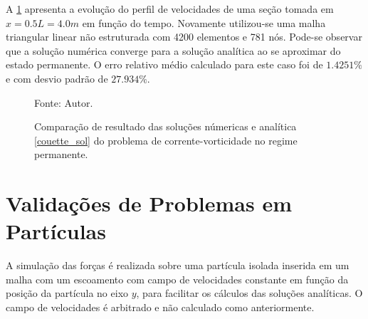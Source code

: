 A \ref{couette_comp} apresenta a evolução do perfil de velocidades de uma seção tomada em $x=0.5L=4.0m$ em função do tempo.
Novamente utilizou-se uma malha triangular linear não estruturada com 4200 elementos e 781 nós.
Pode-se observar que a solução numérica converge para a solução analítica ao se aproximar do estado permanente.
O erro relativo médio calculado para este caso foi de $1.4251\%$ e com desvio padrão de $27.934\%$.
\begin{figure}[H]
    \centering
     {\raggedleft \scriptsize Fonte: Autor.}
    \caption{Comparação de resultado das soluções númericas e analítica \ref{couette_sol} do problema de corrente-vorticidade no regime permanente.}
    \label{couette_comp}
\end{figure}



\section{\textbf{Validações de Problemas em Partículas}}
\label{sec_particulas}
A simulação das forças é realizada sobre uma partícula isolada inserida em um malha com um escoamento com campo de velocidades constante em função da posição da partícula no eixo $y$, para facilitar os cálculos das soluções analíticas.
O campo de velocidades é arbitrado e não calculado como anteriormente.

